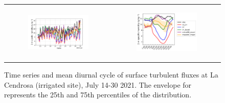 \begin{figure}[hbtp]
\begin{tabular}{cc}
        \begin{subfigure}[t]{0.5\textwidth}
            \caption{}
            \includegraphics[width=\textwidth]{images/chap5/SOP_TS_DC/time_series_cendrosa_q2m.png}
        \end{subfigure} &
        \begin{subfigure}[t]{0.5\textwidth}
            \caption{}
            \includegraphics[width=\textwidth]{images/chap5/SOP_TS_DC/diurnal_cycle_cendrosa_q2m.png}
        \end{subfigure} \\
    \end{tabular}
    \caption{Time series and mean diurnal cycle of surface turbulent fluxes at La Cendrosa (irrigated site), July 14-30 2021. The envelope for \mesomean represents the 25th and 75th percentiles of the distribution.}
    \label{fig:cendrosa_surfacevars}
\end{figure}


